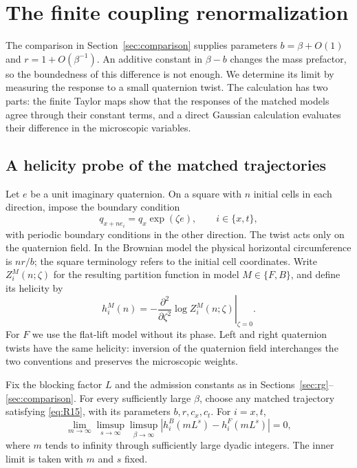 \section{The finite coupling renormalization}
\label{sec:renormalization}

The comparison in Section~\ref{sec:comparison} supplies parameters
$b=\beta+O(1)$ and $r=1+O(\beta^{-1})$. An additive constant in
$\beta-b$ changes the mass prefactor, so the boundedness of this difference
is not enough. We determine its limit by measuring the response to a small
quaternion twist. The calculation has two parts: the finite Taylor maps
show that the responses of the matched models agree through their constant
terms, and a direct Gaussian calculation evaluates their difference in the
microscopic variables.

\subsection{A helicity probe of the matched trajectories}

Let $e$ be a unit imaginary quaternion. On a square with $n$ initial cells
in each direction, impose the boundary condition
\[
 q_{x+ne_i}=q_x\exp(\zeta e),\qquad i\in\{x,t\},
\]
with periodic boundary conditions in the other direction. The twist acts
only on the quaternion field. In the Brownian model the physical horizontal
circumference is $nr/b$; the square terminology refers to the initial cell
coordinates. Write $Z_i^M(n;\zeta)$ for the resulting partition function in
model $M\in\{F,B\}$, and define its helicity by
\[
 h_i^M(n)=-\left.\frac{\partial^2}{\partial\zeta^2}
                       \log Z_i^M(n;\zeta)\right|_{\zeta=0}.
\]
For $F$ we use the flat-lift model without its phase. Left and right
quaternion twists have the same helicity: inversion of the quaternion
field interchanges the two conventions and preserves the microscopic
weights.

\begin{proposition}
\label{prop:matching-helicity}
Fix the blocking factor $L$ and the admission constants as in
Sections~\ref{sec:rg}--\ref{sec:comparison}. For every sufficiently large
$\beta$, choose any matched trajectory satisfying \eqref{eq:R15}, with its
parameters $b,r,c_x,c_t$. For $i=x,t$,
\begin{equation}
 \lim_{m\to\infty}\limsup_{s\to\infty}\limsup_{\beta\to\infty}
 \left|h_i^B(mL^s)-h_i^F(mL^s)\right|=0,
 \label{eq:R18}
\end{equation}
where $m$ tends to infinity through sufficiently large dyadic integers.
The inner limit is taken with $m$ and $s$ fixed.
\end{proposition}

